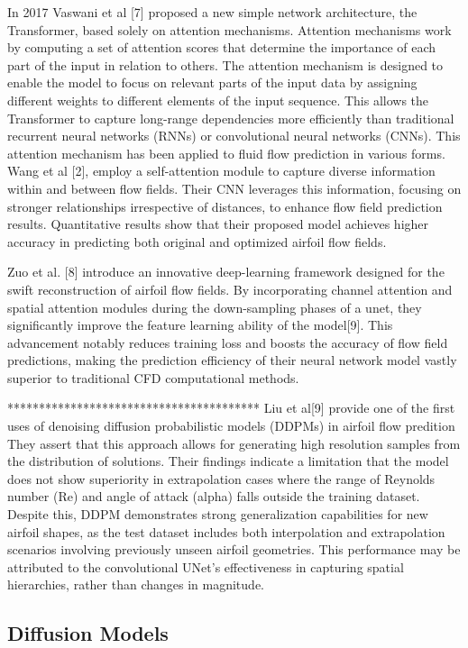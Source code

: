 \documentclass{CUP-JNL-DTM}%
\theoremstyle{definition}
\numberwithin{equation}{section}
\begin{document}
In 2017 Vaswani et al [7] proposed a new simple network architecture, the Transformer, based solely on attention mechanisms. Attention mechanisms work by computing a set of attention scores that determine the importance of each part of the input in relation to others. The attention mechanism is designed to enable the model to focus on relevant parts of the input data by assigning different weights to different elements of the input sequence. This allows the Transformer to capture long-range dependencies more efficiently than traditional recurrent neural networks (RNNs) or convolutional neural networks (CNNs). This attention mechanism has been applied to fluid flow prediction in various forms. Wang et al [2], employ a self-attention module to capture diverse information within and between flow fields. Their CNN leverages this information, focusing on stronger relationships irrespective of distances, to enhance flow field prediction results. Quantitative results show that their proposed model achieves higher accuracy in predicting both original and optimized airfoil flow fields. 

Zuo et al. [8] introduce an innovative deep-learning framework designed for the swift reconstruction of airfoil flow fields. By incorporating channel attention and spatial attention modules during the down-sampling phases of a unet, they significantly improve the feature learning ability of the model[9]. This advancement notably reduces training loss and boosts the accuracy of flow field predictions, making the prediction efficiency of their neural network model vastly superior to traditional CFD computational methods.

****************************************
Liu et al[9] provide one of the first uses of denoising diffusion probabilistic models (DDPMs) in airfoil flow predition  They assert that this approach allows for generating high resolution samples from the distribution of solutions. Their findings indicate a limitation that the model does not show superiority in extrapolation cases where the range of Reynolds number (Re) and angle of attack (alpha) falls outside the training dataset. Despite this, DDPM demonstrates strong generalization capabilities for new airfoil shapes, as the test dataset includes both interpolation and extrapolation scenarios involving previously unseen airfoil geometries. This performance may be attributed to the convolutional UNet's effectiveness in capturing spatial hierarchies, rather than changes in magnitude.

\subsection{Diffusion Models}
\end{document}
